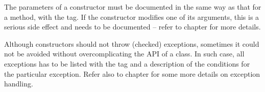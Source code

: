 The parameters of a constructor must be documented in the same way as that for a method, with the  tag. If the constructor modifies one of its arguments, this is a serious side effect and needs to be documented – refer to chapter  for more details.

Although constructors should not throw (checked) exceptions, sometimes it could not be avoided without overcomplicating the API of a class. In such case, all exceptions has to be listed with the  tag and a description of the conditions for the particular exception. Refer also to chapter  for some more details on exception handling.



